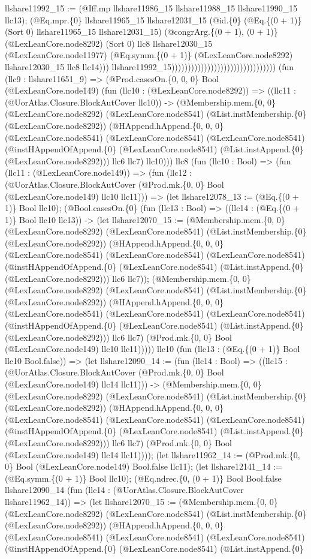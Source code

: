 \documentclass[11pt]{article}
\begin{document}
llshare11992\_15 := (@Iff.mp llshare11986\_15 llshare11988\_15 llshare11990\_15 llc13); (@Eq.mpr.\{0\} llshare11965\_15 llshare12031\_15 (@id.\{0\} (@Eq.\{(0 + 1)\} (Sort 0) llshare11965\_15 llshare12031\_15) (@congrArg.\{(0 + 1), (0 + 1)\} (@LexLeanCore.node8292) (Sort 0) llc8 llshare12030\_15 (@LexLeanCore.node11977) (@Eq.symm.\{(0 + 1)\} (@LexLeanCore.node8292) llshare12030\_15 llc8 llc14))) llshare11992\_15)))))))))))))))))))))))))))))))) (fun (llc9 : llshare11651\_9) => (@Prod.casesOn.\{0, 0, 0\} Bool (@LexLeanCore.node149) (fun (llc10 : (@LexLeanCore.node8292)) => ((llc11 : (@UorAtlas.Closure.BlockAutCover llc10)) -> (@Membership.mem.\{0, 0\} (@LexLeanCore.node8292) (@LexLeanCore.node8541) (@List.instMembership.\{0\} (@LexLeanCore.node8292)) (@HAppend.hAppend.\{0, 0, 0\} (@LexLeanCore.node8541) (@LexLeanCore.node8541) (@LexLeanCore.node8541) (@instHAppendOfAppend.\{0\} (@LexLeanCore.node8541) (@List.instAppend.\{0\} (@LexLeanCore.node8292))) llc6 llc7) llc10))) llc8 (fun (llc10 : Bool) => (fun (llc11 : (@LexLeanCore.node149)) => (fun (llc12 : (@UorAtlas.Closure.BlockAutCover (@Prod.mk.\{0, 0\} Bool (@LexLeanCore.node149) llc10 llc11))) => (let llshare12078\_13 := (@Eq.\{(0 + 1)\} Bool llc10); (@Bool.casesOn.\{0\} (fun (llc13 : Bool) => ((llc14 : (@Eq.\{(0 + 1)\} Bool llc10 llc13)) -> (let llshare12070\_15 := (@Membership.mem.\{0, 0\} (@LexLeanCore.node8292) (@LexLeanCore.node8541) (@List.instMembership.\{0\} (@LexLeanCore.node8292)) (@HAppend.hAppend.\{0, 0, 0\} (@LexLeanCore.node8541) (@LexLeanCore.node8541) (@LexLeanCore.node8541) (@instHAppendOfAppend.\{0\} (@LexLeanCore.node8541) (@List.instAppend.\{0\} (@LexLeanCore.node8292))) llc6 llc7)); (@Membership.mem.\{0, 0\} (@LexLeanCore.node8292) (@LexLeanCore.node8541) (@List.instMembership.\{0\} (@LexLeanCore.node8292)) (@HAppend.hAppend.\{0, 0, 0\} (@LexLeanCore.node8541) (@LexLeanCore.node8541) (@LexLeanCore.node8541) (@instHAppendOfAppend.\{0\} (@LexLeanCore.node8541) (@List.instAppend.\{0\} (@LexLeanCore.node8292))) llc6 llc7) (@Prod.mk.\{0, 0\} Bool (@LexLeanCore.node149) llc10 llc11))))) llc10 (fun (llc13 : (@Eq.\{(0 + 1)\} Bool llc10 Bool.false)) => (let llshare12090\_14 := (fun (llc14 : Bool) => ((llc15 : (@UorAtlas.Closure.BlockAutCover (@Prod.mk.\{0, 0\} Bool (@LexLeanCore.node149) llc14 llc11))) -> (@Membership.mem.\{0, 0\} (@LexLeanCore.node8292) (@LexLeanCore.node8541) (@List.instMembership.\{0\} (@LexLeanCore.node8292)) (@HAppend.hAppend.\{0, 0, 0\} (@LexLeanCore.node8541) (@LexLeanCore.node8541) (@LexLeanCore.node8541) (@instHAppendOfAppend.\{0\} (@LexLeanCore.node8541) (@List.instAppend.\{0\} (@LexLeanCore.node8292))) llc6 llc7) (@Prod.mk.\{0, 0\} Bool (@LexLeanCore.node149) llc14 llc11)))); (let llshare11962\_14 := (@Prod.mk.\{0, 0\} Bool (@LexLeanCore.node149) Bool.false llc11); (let llshare12141\_14 := (@Eq.symm.\{(0 + 1)\} Bool llc10); (@Eq.ndrec.\{0, (0 + 1)\} Bool Bool.false llshare12090\_14 (fun (llc14 : (@UorAtlas.Closure.BlockAutCover llshare11962\_14)) => (let llshare12070\_15 := (@Membership.mem.\{0, 0\} (@LexLeanCore.node8292) (@LexLeanCore.node8541) (@List.instMembership.\{0\} (@LexLeanCore.node8292)) (@HAppend.hAppend.\{0, 0, 0\} (@LexLeanCore.node8541) (@LexLeanCore.node8541) (@LexLeanCore.node8541) (@instHAppendOfAppend.\{0\} (@LexLeanCore.node8541) (@List.instAppend.\{0\} 
\end{document}
